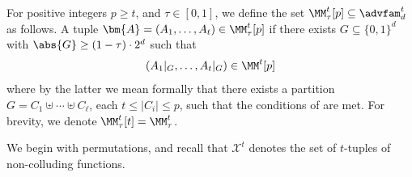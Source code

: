\documentclass{toc}
\begin{document}
\begin{definition}\label{def:smooth inv}
	For positive integers $p \ge t$, and $\tau \in [0,1]$, we define the 
	set $\MM_\tau^t[p] \subseteq \advfam_d^t$ as follows. A tuple $
	\bm{A} =(A_1,\ldots,A_t) \in \MM_\tau^t[p]$ if there exists $G 
	\subseteq \{0,1\}^d$ with $\abs{G} \geq (1-\tau)\cdot2^d$ such that 
\[
\left( A_1|_G,\ldots,A_t|_G \right) \in \MM^t[p]
\]
where by the latter we mean formally that there exists a partition $G = C_1 \uplus \cdots \uplus C_\ell$, each $t \le |C_i| \le p$, such that
the conditions of  are met. For brevity, we denote $\MM_{\tau}^t[t] = \MM_\tau^t$.
%
\end{definition}

We begin with permutations, and recall that $\mathcal{X}^{t}$ denotes the set of $t$-tuples of non-colluding functions.
\end{document}
